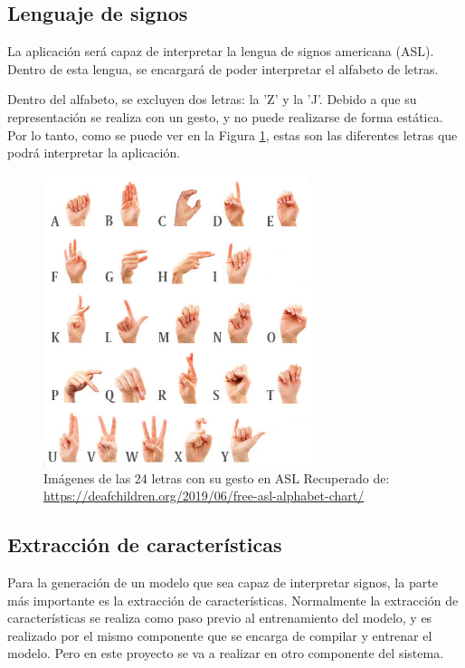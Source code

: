 \documentclass[../main.tex]{subfiles}
\begin{document}
\subsection{Lenguaje de signos}

La aplicación será capaz de interpretar la lengua de signos americana (ASL). Dentro de esta lengua, se encargará de poder interpretar el alfabeto de letras. 

Dentro del alfabeto, se excluyen dos letras: la 'Z' y la 'J'. Debido a que su representación se realiza con un gesto, y no puede realizarse de forma estática. Por lo tanto, como se puede ver en la Figura \ref{figure1}, estas son las diferentes letras que podrá interpretar la aplicación.


\begin{figure}[h]
\centering 
\includegraphics[width=0.7\textwidth]{images/alphabet_modify.png}
\caption{Imágenes de las 24 letras con su gesto en ASL \small Recuperado de: \url{https://deafchildren.org/2019/06/free-asl-alphabet-chart/}}
\label{figure1}
\end{figure}

\subsection{Extracción de características}

Para la generación de un modelo que sea capaz de interpretar signos, la parte más importante es la extracción de características.  Normalmente la extracción de características se realiza como paso previo al entrenamiento del modelo, y es realizado por el mismo componente que se encarga de compilar y entrenar el modelo. Pero en este proyecto se va a realizar en otro componente del sistema.
\end{document}
